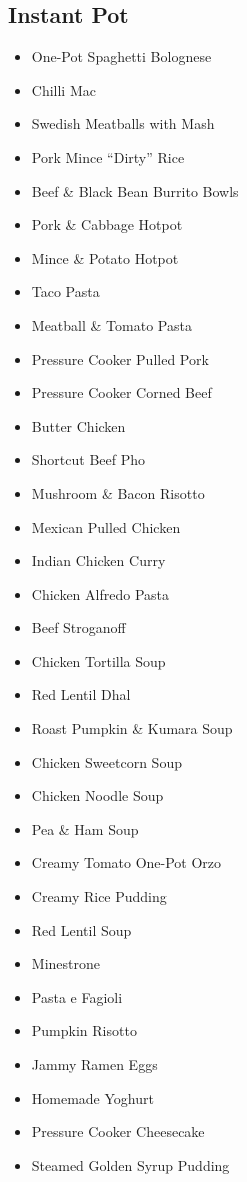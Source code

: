 \subsection*{Instant Pot}

\begin{itemize}
  \item \todo One-Pot Spaghetti Bolognese
  \item \todo Chilli Mac
  \item \todo Swedish Meatballs with Mash
  \item \todo Pork Mince ``Dirty'' Rice
  \item \todo Beef \& Black Bean Burrito Bowls
  \item \todo Pork \& Cabbage Hotpot
  \item \todo Mince \& Potato Hotpot
  \item \todo Taco Pasta
  \item \todo Meatball \& Tomato Pasta
\end{itemize}

\begin{itemize}
  \item \todo Pressure Cooker Pulled Pork
  \item \todo Pressure Cooker Corned Beef
  \item \todo Butter Chicken 
  \item \todo Shortcut Beef Pho
  \item \todo Mushroom \& Bacon Risotto
  \item \todo Mexican Pulled Chicken
  \item \todo Indian Chicken Curry
  \item \todo Chicken Alfredo Pasta
  \item \todo Beef Stroganoff
  \item \todo Chicken Tortilla Soup
\end{itemize}

\begin{itemize}
  \item \todo Red Lentil Dhal
  \item \todo Roast Pumpkin \& Kumara Soup
  \item \todo Chicken Sweetcorn Soup
  \item \todo Chicken Noodle Soup
  \item \todo Pea \& Ham Soup
  \item \todo Creamy Tomato One-Pot Orzo
  \item \todo Creamy Rice Pudding
  \item \todo Red Lentil Soup
  \item \todo Minestrone
  \item \todo Pasta e Fagioli
  \item \todo Pumpkin Risotto
\end{itemize}

\begin{itemize}
  \item \todo Jammy Ramen Eggs
  \item \todo Homemade Yoghurt
  \item \todo Pressure Cooker Cheesecake
  \item \todo Steamed Golden Syrup Pudding
\end{itemize}
